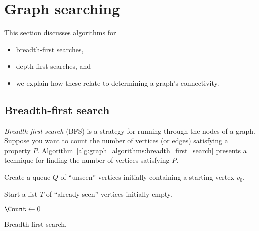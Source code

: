 \section{Graph searching}

This section discusses algorithms for

\begin{itemize}
\item
breadth-first searches,

\item
depth-first searches, and

\item
we explain how these relate to determining a graph's connectivity.
\end{itemize}



\subsection{Breadth-first search}

\emph{Breadth-first search} (BFS) is a strategy for running through
the nodes of a graph. Suppose you want to count the number of vertices
(or edges) satisfying a property
$P$. Algorithm~\ref{alg:graph_algorithms:breadth_first_search}
presents a technique for finding the number of vertices satisfying $P$.

\begin{algorithm}[!htpb]
\dontprintsemicolon  %
\BlankLine
Create a queue $Q$ of ``unseen'' vertices initially containing a
starting vertex $v_0$.\;

Start a list $T$ of ``already seen'' vertices initially empty.\;

$\Count \leftarrow 0$\;

\caption{Breadth-first search.}
\label{alg:graph_algorithms:breadth_first_search}
\end{algorithm}

